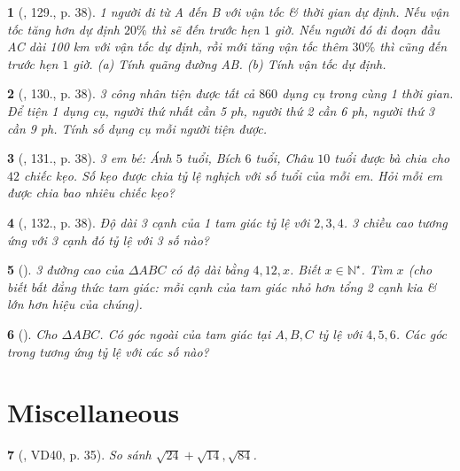 \documentclass{article}
\newtheorem{baitoan}{}
\begin{document}
\begin{baitoan}[\cite{Binh_Toan_7_tap_1}, 129., p. 38]
	1 người đi từ A đến B với vận tốc \& thời gian dự định. Nếu vận tốc tăng hơn dự định $20\%$ thì sẽ đến trước hẹn $1$ giờ. Nếu người đó đi đoạn đầu AC dài {\rm100 km} với vận tốc dự định, rồi mới tăng vận tốc thêm $30\%$ thì cũng đến trước hẹn $1$ giờ. (a) Tính quãng đường AB. (b) Tính vận tốc dự định.
\end{baitoan}

\begin{baitoan}[\cite{Binh_Toan_7_tap_1}, 130., p. 38]
	3 công nhân tiện được tất cả $860$ dụng cụ trong cùng 1 thời gian. Để tiện 1 dụng cụ, người thứ nhất cần {\rm5 ph}, người thứ 2 cần {\rm6 ph}, người thứ 3 cần {\rm9 ph}. Tính số dụng cụ mỗi người tiện được.
\end{baitoan}

\begin{baitoan}[\cite{Binh_Toan_7_tap_1}, 131., p. 38]
	3 em bé: Ánh $5$ tuổi, Bích $6$ tuổi, Châu $10$ tuổi được bà chia cho $42$ chiếc kẹo. Số kẹo được chia tỷ lệ nghịch với số tuổi của mỗi em. Hỏi mỗi em được chia bao nhiêu chiếc kẹo?
\end{baitoan}

\begin{baitoan}[\cite{Binh_Toan_7_tap_1}, 132., p. 38]
	Độ dài 3 cạnh của 1 tam giác tỷ lệ với $2,3,4$. 3 chiều cao tương ứng với 3 cạnh đó tỷ lệ với 3 số nào?
\end{baitoan}

\begin{baitoan}[\cite{Binh_Toan_7_tap_1}]
	3 đường cao của $\Delta ABC$ có độ dài bằng $4,12,x$. Biết $x\in\mathbb{N}^\star$. Tìm $x$ (cho biết {\rm bất đẳng thức tam giác}: mỗi cạnh của tam giác nhỏ hơn tổng 2 cạnh kia \& lớn hơn hiệu của chúng).
\end{baitoan}

\begin{baitoan}[\cite{Binh_Toan_7_tap_1}]
	Cho $\Delta ABC$. Có góc ngoài của tam giác tại $A,B,C$ tỷ lệ với $4,5,6$. Các góc trong tương ứng tỷ lệ với các số nào?
\end{baitoan}


\section{Miscellaneous}

\begin{baitoan}[\cite{Tuyen_Toan_7}, VD40, p. 35]
	So sánh $\sqrt{24} + \sqrt{14},\sqrt{84}$.
\end{baitoan}
\end{document}
